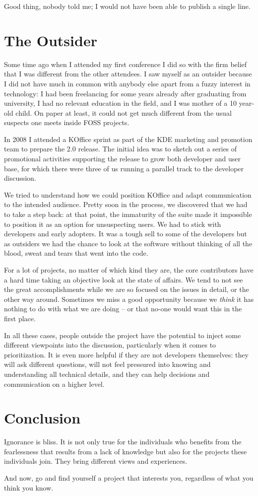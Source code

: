 Good thing, nobody told me; I would not have been able to publish a single line.

\section*{The Outsider}

Some time ago when I attended my first conference I did so with the firm belief that I was different from the other attendees. I saw myself as an outsider because I did not have much in common with anybody else apart from a fuzzy interest in technology: I had been freelancing for some years already after graduating from university, I had no relevant education in the field, and I was mother of a 10 year-old child. On paper at least, it could not get much different from the usual suspects one meets inside FOSS projects.

In 2008 I attended a KOffice sprint as part of the KDE marketing and promotion team to prepare the 2.0 release. The initial idea was to sketch out a series of promotional activities supporting the release to grow both developer and user base, for which there were three of us running a parallel track to the developer discussion.

We tried to understand how we could position KOffice and adapt communication to the intended audience. Pretty soon in the process, we discovered that we had to take a step back: at that point, the immaturity of the suite made it impossible to position it as an option for unsuspecting users. We had to stick with developers and early adopters. It was a tough sell to some of the developers but as outsiders we had the chance to look at the software without thinking of all the blood, sweat and tears that went into the code.

For a lot of projects, no matter of which kind they are, the core contributors have a hard time taking an objective look at the state of affairs. We tend to not see the great accomplishments while we are so focused on the issues in detail, or the other way around. Sometimes we miss a good opportunity because we \textit{think} it has nothing to do with what we are doing -- or that no-one would want this in the first place.

In all these cases, people outside the project have the potential to inject some different viewpoints into the discussion, particularly when it comes to prioritization. It is even more helpful if they are not developers themselves: they will ask different questions, will not feel pressured into knowing and understanding all technical details, and they can help decisions and communication on a higher level.

\section*{Conclusion}

Ignorance is bliss. It is not only true for the individuals who benefits from the fearlessness that results from a lack of knowledge but also for the projects these individuals join. They bring different views and experiences.

And now, go and find yourself a project that interests you, regardless of what you think you know.
